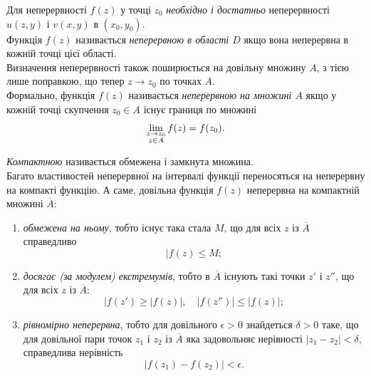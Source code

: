 Для неперервності $f(z)$ у точці $z_0$ \textit{необхідно і достатньо} неперервності $u(z, y)$ і $v(x, y)$ в $(x_0, y_0)$. \\

Функція $f(z)$ називається \textit{неперервною в області $D$} якщо вона неперервна в кожній точці цієї області. \\

Визначення неперервності також поширюється на довільну множину $A$, з тією лише поправкою, що тепер $z \to z_0$ по точках $A$. \\

Формально, функція $f(z)$ називається \textit{неперервною на множині $A$} якщо у кожній точці скупчення $z_0 \in A$ існує границя по множині
\begin{equation}
	\label{eq:2.2.8}
	\displaystyle\lim\limits_{\substack{z \to z_0 \\ z \in A}} f(z) = f(z_0).
\end{equation}

\textit{Компактною} називається обмежена і замкнута множина. \\

Багато властивостей неперервної на інтервалі функції переносяться на неперервну на компакті функцію. А саме, довільна функція $f(z)$ неперервна на компактній множині $\overline{A}$:
\begin{enumerate}
	\item \textit{обмежена на ньому}, тобто існує така стала $M$, що для всіх $z$ із $\overline{A}$ справедливо
	\begin{equation}
		\label{eq:2.2.9}
		|f(z) \le M;
	\end{equation}
	\item \textit{досягає (за модулем) екстремумів}, тобто в $\overline{A}$ існують такі точки $z'$ і $z''$, що для всіх $z$ із $\overline{A}$:
	\begin{equation}
		\label{eq:2.2.10}
		|f(z') \ge |f(z)|, \quad |f(z'')| \le |f(z)|;
	\end{equation}
	\item \textit{рівномірно неперервна}, тобто для довільного $\epsilon > 0$ знайдеться $\delta > 0$ таке, що для довільної пари точок $z_1$ і $z_2$ із $\overline{A}$ яка задовольняє нерівності $|z_1 - z_2| < \delta$, справедлива нерівність
	\begin{equation}
		\label{eq:2.2.11}
		|f(z_1) - f(z_2)| < \epsilon.
	\end{equation}
\end{enumerate}

